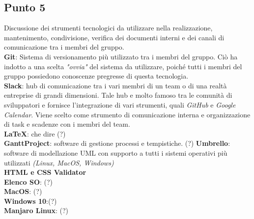 \subsection{Punto 5}
Discussione dei strumenti tecnologici da utilizzare nella realizzazione, mantenimento, condivisione, verifica dei documenti interni e dei canali di comunicazione tra i membri del gruppo. \\
\textbf{Git}: Sistema di versionamento più utilizzato tra i membri del gruppo. Ciò ha indotto a una scelta \textit{"ovvia"} del sistema da utilizzare, poiché tutti i membri del gruppo possiedono conoscenze pregresse di questa tecnologia. \\ 
\textbf{Slack}: hub di comunicazione tra i vari membri di un team o di una realtà entreprise di grandi dimensioni. Tale hub e molto famoso tra le comunità di sviluppatori e fornisce l'integrazione di vari strumenti, quali \textit{GitHub} e \textit{Google Calendar}. Viene scelto come strumento di comunicazione interna e organizzazione di task e scadenze con i membri del team. \\
\textbf{LaTeX}: che dire (?) \\
\textbf{GanttProject}: software di gestione processi e tempistiche. (?) 
\textbf{Umbrello}: software di modellazione UML con supporto a tutti i sistemi operativi più utilizzati \textit{(Linux, MacOS, Windows)} \\
\textbf{HTML e CSS Validator} \\
\textbf{Elenco SO}: (?) \\ 
\textbf{MacOS}: (?) \\
\textbf{Windows 10}:(?) \\ 
\textbf{Manjaro Linux}: (?)




